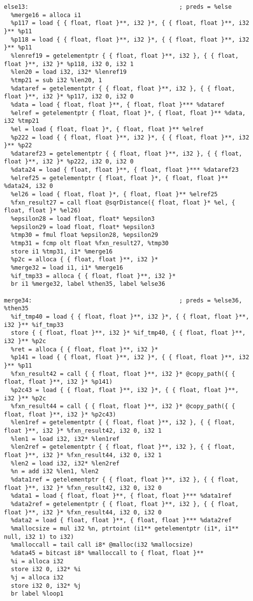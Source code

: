 \documentclass[main.tex]{subfiles}
\begin{document}
{\begin{lstlisting}
else13:                                           ; preds = %else
  %merge16 = alloca i1
  %p117 = load { { float, float }**, i32 }*, { { float, float }**, i32 }** %p11
  %p118 = load { { float, float }**, i32 }*, { { float, float }**, i32 }** %p11
  %lenref19 = getelementptr { { float, float }**, i32 }, { { float, float }**, i32 }* %p118, i32 0, i32 1
  %len20 = load i32, i32* %lenref19
  %tmp21 = sub i32 %len20, 1
  %dataref = getelementptr { { float, float }**, i32 }, { { float, float }**, i32 }* %p117, i32 0, i32 0
  %data = load { float, float }**, { float, float }*** %dataref
  %elref = getelementptr { float, float }*, { float, float }** %data, i32 %tmp21
  %el = load { float, float }*, { float, float }** %elref
  %p222 = load { { float, float }**, i32 }*, { { float, float }**, i32 }** %p22
  %dataref23 = getelementptr { { float, float }**, i32 }, { { float, float }**, i32 }* %p222, i32 0, i32 0
  %data24 = load { float, float }**, { float, float }*** %dataref23
  %elref25 = getelementptr { float, float }*, { float, float }** %data24, i32 0
  %el26 = load { float, float }*, { float, float }** %elref25
  %fxn_result27 = call float @sqrDistance({ float, float }* %el, { float, float }* %el26)
  %epsilon28 = load float, float* %epsilon3
  %epsilon29 = load float, float* %epsilon3
  %tmp30 = fmul float %epsilon28, %epsilon29
  %tmp31 = fcmp olt float %fxn_result27, %tmp30
  store i1 %tmp31, i1* %merge16
  %p2c = alloca { { float, float }**, i32 }*
  %merge32 = load i1, i1* %merge16
  %if_tmp33 = alloca { { float, float }**, i32 }*
  br i1 %merge32, label %then35, label %else36

merge34:                                          ; preds = %else36, %then35
  %if_tmp40 = load { { float, float }**, i32 }*, { { float, float }**, i32 }** %if_tmp33
  store { { float, float }**, i32 }* %if_tmp40, { { float, float }**, i32 }** %p2c
  %ret = alloca { { float, float }**, i32 }*
  %p141 = load { { float, float }**, i32 }*, { { float, float }**, i32 }** %p11
  %fxn_result42 = call { { float, float }**, i32 }* @copy_path({ { float, float }**, i32 }* %p141)
  %p2c43 = load { { float, float }**, i32 }*, { { float, float }**, i32 }** %p2c
  %fxn_result44 = call { { float, float }**, i32 }* @copy_path({ { float, float }**, i32 }* %p2c43)
  %len1ref = getelementptr { { float, float }**, i32 }, { { float, float }**, i32 }* %fxn_result42, i32 0, i32 1
  %len1 = load i32, i32* %len1ref
  %len2ref = getelementptr { { float, float }**, i32 }, { { float, float }**, i32 }* %fxn_result44, i32 0, i32 1
  %len2 = load i32, i32* %len2ref
  %n = add i32 %len1, %len2
  %data1ref = getelementptr { { float, float }**, i32 }, { { float, float }**, i32 }* %fxn_result42, i32 0, i32 0
  %data1 = load { float, float }**, { float, float }*** %data1ref
  %data2ref = getelementptr { { float, float }**, i32 }, { { float, float }**, i32 }* %fxn_result44, i32 0, i32 0
  %data2 = load { float, float }**, { float, float }*** %data2ref
  %mallocsize = mul i32 %n, ptrtoint (i1** getelementptr (i1*, i1** null, i32 1) to i32)
  %malloccall = tail call i8* @malloc(i32 %mallocsize)
  %data45 = bitcast i8* %malloccall to { float, float }**
  %i = alloca i32
  store i32 0, i32* %i
  %j = alloca i32
  store i32 0, i32* %j
  br label %loop1


\end{lstlisting}}
\end{document}
